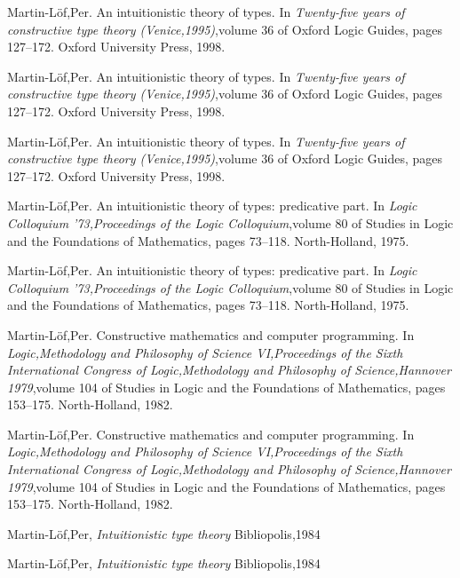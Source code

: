 \documentclass[12pt]{article}
\begin{document}
\begin{thebibliography}{99}
 {Martin-L{\"o}f,Per}. {An intuitionistic theory of types}. In \emph{Twenty-five years of constructive type theory ({V}enice,1995)},volume 36 of {Oxford Logic Guides}, pages {127--172}. {Oxford University Press}, 1998.

 {Martin-L{\"o}f,Per}. {An intuitionistic theory of types}. In \emph{Twenty-five years of constructive type theory ({V}enice,1995)},volume 36 of {Oxford Logic Guides}, pages {127--172}. {Oxford University Press}, 1998.

 {Martin-L{\"o}f,Per}. {An intuitionistic theory of types}. In \emph{Twenty-five years of constructive type theory ({V}enice,1995)},volume 36 of {Oxford Logic Guides}, pages {127--172}. {Oxford University Press}, 1998.

 {Martin-L{\"o}f,Per}. {An intuitionistic theory of types: predicative part}. In \emph{Logic Colloquium '73,Proceedings of the Logic Colloquium},volume 80 of {Studies in Logic and the Foundations of Mathematics}, pages {73--118}. {North-Holland}, 1975.

 {Martin-L{\"o}f,Per}. {An intuitionistic theory of types: predicative part}. In \emph{Logic Colloquium '73,Proceedings of the Logic Colloquium},volume 80 of {Studies in Logic and the Foundations of Mathematics}, pages {73--118}. {North-Holland}, 1975.

 {Martin-L{\"o}f,Per}. {Constructive mathematics and computer programming}. In \emph{Logic,Methodology and Philosophy of Science VI,Proceedings of the Sixth International Congress of Logic,Methodology and Philosophy of Science,Hannover 1979},volume 104 of {Studies in Logic and the Foundations of Mathematics}, pages {153--175}. {North-Holland}, 1982.

 {Martin-L{\"o}f,Per}. {Constructive mathematics and computer programming}. In \emph{Logic,Methodology and Philosophy of Science VI,Proceedings of the Sixth International Congress of Logic,Methodology and Philosophy of Science,Hannover 1979},volume 104 of {Studies in Logic and the Foundations of Mathematics}, pages {153--175}. {North-Holland}, 1982.

 {Martin-L{\"o}f,Per}, \emph{{Intuitionistic type theory}}  {Bibliopolis},{1984}

 {Martin-L{\"o}f,Per}, \emph{{Intuitionistic type theory}}  {Bibliopolis},{1984}


\end{thebibliography}
\end{document}
